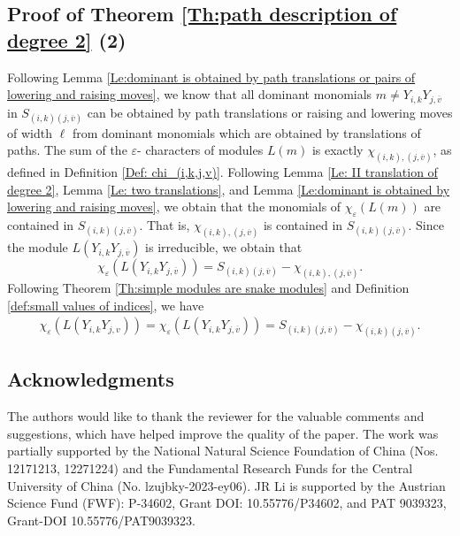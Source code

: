 \documentclass[12pt, reqno]{amsart}
\numberwithin{equation}{section}
\begin{document}
{\subsection{Proof of Theorem \ref{Th:path description of degree 2} (2)}
Following Lemma \ref{Le:dominant is obtained by path translations or pairs of lowering and raising moves}, we know that all dominant monomials $m\neq Y_{i,k}Y_{j,\overline{v}}$ in $S_{(i, k)(j, \overline{v})}$ can be obtained by path translations or raising and lowering moves of width $\ell$ from dominant monomials which are obtained by translations of paths. The sum of the $\varepsilon$- characters of modules $L(m)$ is exactly $\chi_{(i,k),(j,\overline{v})}$, as defined in Definition \ref{Def: chi_(i,k,j,v)}. Following Lemma \ref{Le: II translation of degree 2}, Lemma \ref{Le: two translations}, and Lemma \ref{Le:dominant is obtained by lowering and raising moves}, we obtain that the monomials of $\chi_{\varepsilon}(L(m))$ are contained in $S_{(i, k)(j, \overline{v})}$. That is, $\chi_{(i,k),(j,\overline{v})}$ is contained in $S_{(i, k)(j,\overline{v})}$. Since the module $L(Y_{i,k}Y_{j,\overline{v}})$ is irreducible, we obtain that
\[
\chi_{\varepsilon}(L(Y_{i,k}Y_{j,\overline{v}}))=S_{(i,k)(j,\overline{v})}-\chi_{(i,k),(j,\overline{v})}.
\]
Following Theorem \ref{Th:simple modules are snake modules} and Definition \ref{def:small values of indices}, we have
\begin{align*}
\chi_{\varepsilon}(L(Y_{i,k}Y_{j,v}))=\chi_{\varepsilon}(L(Y_{i,k}Y_{j,\overline{v}}))
=S_{(i,k)(j,\overline{v})}-\chi_{(i,k) (j,\overline{v})}.
\end{align*}


\subsection*{Acknowledgments}
The authors would like to thank the reviewer for the valuable comments and suggestions, which have helped improve the quality of the paper. The work was partially supported by the National Natural Science Foundation of China (Nos. 12171213, 12271224) and the Fundamental Research Funds for the Central University of China (No. lzujbky-2023-ey06). JR Li is supported by the Austrian Science Fund (FWF): P-34602, Grant DOI: 10.55776/P34602, and PAT 9039323, Grant-DOI 10.55776/PAT9039323.}
\end{document}
